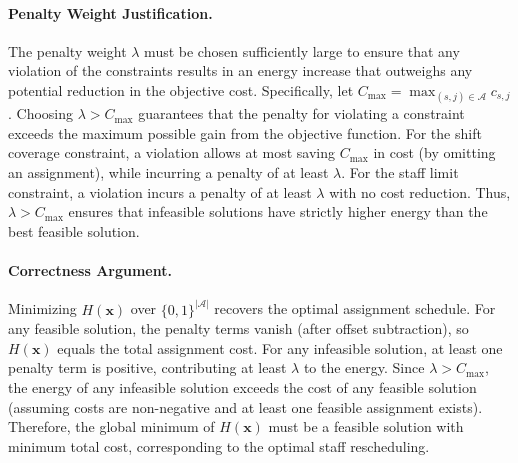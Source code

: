 \documentclass[12pt]{article}
\begin{document}
\paragraph{Penalty Weight Justification.}
The penalty weight $\lambda$ must be chosen sufficiently large to ensure that any violation of the constraints results in an energy increase that outweighs any potential reduction in the objective cost. Specifically, let $C_{\max} = \max_{(s,j) \in \mathcal{A}} c_{s,j}$. Choosing $\lambda > C_{\max}$ guarantees that the penalty for violating a constraint exceeds the maximum possible gain from the objective function. For the shift coverage constraint, a violation allows at most saving $C_{\max}$ in cost (by omitting an assignment), while incurring a penalty of at least $\lambda$. For the staff limit constraint, a violation incurs a penalty of at least $\lambda$ with no cost reduction. Thus, $\lambda > C_{\max}$ ensures that infeasible solutions have strictly higher energy than the best feasible solution.

\paragraph{Correctness Argument.}
Minimizing $H(\mathbf{x})$ over $\{0,1\}^{|\mathcal{A}|}$ recovers the optimal assignment schedule. For any feasible solution, the penalty terms vanish (after offset subtraction), so $H(\mathbf{x})$ equals the total assignment cost. For any infeasible solution, at least one penalty term is positive, contributing at least $\lambda$ to the energy. Since $\lambda > C_{\max}$, the energy of any infeasible solution exceeds the cost of any feasible solution (assuming costs are non-negative and at least one feasible assignment exists). Therefore, the global minimum of $H(\mathbf{x})$ must be a feasible solution with minimum total cost, corresponding to the optimal staff rescheduling.
\end{document}
